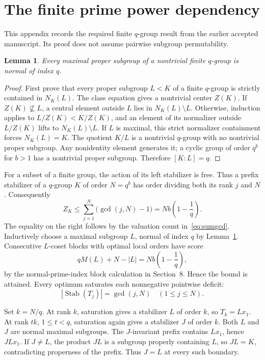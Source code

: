 \documentclass[11pt,letterpaper]{article}
\newtheorem{lemma}[theorem]{Lemma}
\theoremstyle{definition}
\newcommand{\Stab}{\operatorname{Stab}}
\begin{document}
\appendix
\section{The finite prime power dependency}\label{app:qbase}
This appendix records the required finite $q$-group result from the earlier accepted manuscript. Its proof does not assume pairwise subgroup permutability.

\begin{lemma}\label{lem:normal}
Every maximal proper subgroup of a nontrivial finite $q$-group is normal of index $q$.
\end{lemma}
\begin{proof}
First prove that every proper subgroup $L<K$ of a finite $q$-group is strictly contained in $N_K(L)$. The class equation gives a nontrivial center $Z(K)$. If $Z(K)\not\subseteq L$, a central element outside $L$ lies in $N_K(L)\setminus L$. Otherwise, induction applies to $L/Z(K)<K/Z(K)$, and an element of its normalizer outside $L/Z(K)$ lifts to $N_K(L)\setminus L$. If $L$ is maximal, this strict normalizer containment forces $N_K(L)=K$. The quotient $K/L$ is a nontrivial $q$-group with no nontrivial proper subgroup. Any nonidentity element generates it; a cyclic group of order $q^b$ for $b>1$ has a nontrivial proper subgroup. Therefore $[K:L]=q$.
\end{proof}

For a subset of a finite group, the action of its left stabilizer is free. Thus a prefix stabilizer of a $q$-group $K$ of order $N=q^b$ has order dividing both its rank $j$ and $N$. Consequently
\[
Z_K\le\sum_{j=1}^{N}\bigl(\gcd(j,N)-1\bigr)=Nb\left(1-\frac1q\right).
\]
The equality on the right follows by the valuation count in~\eqref{eq:sumgcd}. Inductively choose a maximal subgroup $L$, normal of index $q$ by Lemma~\ref{lem:normal}. Consecutive $L$-coset blocks with optimal local orders have score
\[
qM(L)+N-|L|=Nb\left(1-\frac1q\right),
\]
by the normal-prime-index block calculation in Section~8. Hence the bound is attained. Every optimum saturates each nonnegative pointwise deficit:
\begin{equation}
|\Stab(T_j)|=\gcd(j,N)\quad(1\le j\le N).\label{eq:saturate}
\end{equation}

Set $k=N/q$. At rank $k$, saturation gives a stabilizer $L$ of order $k$, so $T_k=Lx_1$. At rank $tk$, $1\le t<q$, saturation again gives a stabilizer $J$ of order $k$. Both $L$ and $J$ are normal maximal subgroups. The $J$-invariant prefix contains $Lx_1$, hence $JLx_1$. If $J\ne L$, the product $JL$ is a subgroup properly containing $L$, so $JL=K$, contradicting properness of the prefix. Thus $J=L$ at every such boundary.
\end{document}
